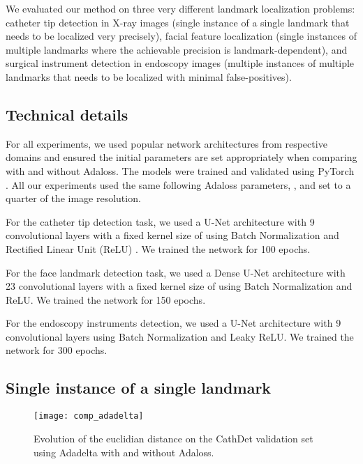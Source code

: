 \documentclass[10pt,twocolumn,letterpaper]{article}
\begin{document}
We evaluated our method on three very different landmark localization problems: catheter tip detection in X-ray images (single instance of a single landmark that needs to be localized very precisely), facial feature localization (single instances of multiple landmarks where the achievable precision is landmark-dependent), and surgical instrument detection in endoscopy images (multiple instances of multiple landmarks that needs to be localized with minimal false-positives).

\subsection{Technical details}

For all experiments, we used popular network architectures from respective
domains and ensured the initial parameters
are set appropriately when comparing with and without Adaloss. The
models were trained and validated using PyTorch
\cite{paszke2017automatic}. All our experiments used the same following
Adaloss parameters, ,  and  set to a quarter of the image resolution.
\par
For the catheter tip detection task, we used a U-Net architecture
\cite{unet} with 9 convolutional layers with a fixed kernel size of  using Batch Normalization \cite{batchnorm} and Rectified Linear Unit (ReLU) \cite{relu}. 
We trained the network for 100 epochs.
\par
For the face landmark detection task, we used a Dense U-Net architecture
\cite{denseunet} with 23 convolutional layers with a fixed kernel size of  using Batch Normalization and ReLU. We trained the network for 150 epochs.
\par
For the endoscopy instruments detection, we used a U-Net architecture
\cite{unet} with 9 convolutional layers using Batch Normalization and Leaky ReLU. 
We trained the network for 300 epochs.


\subsection{Single instance of a single landmark}

\begin{figure}[t]
  \centering
  \texttt{[image: comp\_adadelta]}
    \caption{Evolution of the euclidian distance on the
    CathDet validation set using Adadelta with and without
    Adaloss.
  }
  \label{fig:comp_adadelta}
\end{figure}
\end{document}

